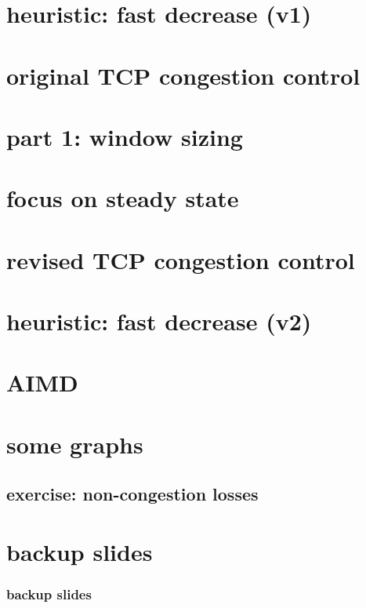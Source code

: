 \section{heuristic: fast decrease (v1)}


\section{original TCP congestion control}


\section{part 1: window sizing}

\section{focus on steady state}


\section{revised TCP congestion control}


\section{heuristic: fast decrease (v2)}


\section{AIMD}



\section{some graphs}



\subsection{exercise: non-congestion losses} %



\section{backup slides}
\begin{frame}\frametitle{backup slides}
\end{frame}




